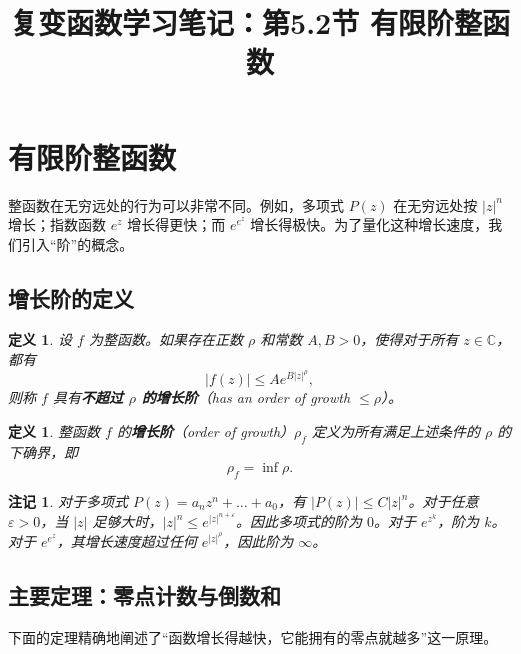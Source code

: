 \documentclass[UTF8]{ctexart}
\title{复变函数学习笔记：第5.2节 有限阶整函数}
\author{}
\date{}
\newtheorem{definition}[theorem]{定义}
\newtheorem{remark}{注记}[section]
\numberwithin{equation}{section}
\newcommand{\CC}{\mathbb{C}}
\begin{document}
\maketitle

\section{有限阶整函数}

整函数在无穷远处的行为可以非常不同。例如，多项式 \(P(z)\) 在无穷远处按 \(|z|^n\) 增长；指数函数 \(e^z\) 增长得更快；而 \(e^{e^z}\) 增长得极快。为了量化这种增长速度，我们引入“阶”的概念。

\subsection{增长阶的定义}

\begin{definition}
设 \(f\) 为整函数。如果存在正数 \(\rho\) 和常数 \(A, B > 0\)，使得对于所有 \(z \in \CC\)，都有
\begin{equation}
|f(z)| \le A e^{B|z|^\rho},
\end{equation}
则称 \(f\) 具有\textbf{不超过 \(\rho\) 的增长阶}（has an order of growth \(\le \rho\)）。
\end{definition}

\begin{definition}
整函数 \(f\) 的\textbf{增长阶}（order of growth）\(\rho_f\) 定义为所有满足上述条件的 \(\rho\) 的下确界，即
\begin{equation}
\rho_f = \inf \rho .
\end{equation}
\end{definition}

\begin{remark}
对于多项式 \(P(z) = a_n z^n + \dots + a_0\)，有 \(|P(z)| \le C |z|^n\)。对于任意 \(\varepsilon > 0\)，当 \(|z|\) 足够大时，\(|z|^n \le e^{|z|^{n+\varepsilon}}\)。因此多项式的阶为 \(0\)。对于 \(e^{z^k}\)，阶为 \(k\)。对于 \(e^{e^z}\)，其增长速度超过任何 \(e^{|z|^\rho}\)，因此阶为 \(\infty\)。
\end{remark}

\subsection{主要定理：零点计数与倒数和}

下面的定理精确地阐述了“函数增长得越快，它能拥有的零点就越多”这一原理。
\end{document}
